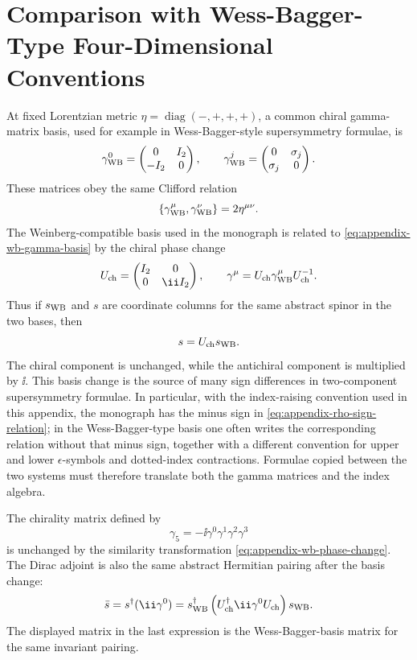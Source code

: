 \section{Comparison with Wess-Bagger-Type Four-Dimensional Conventions}

At fixed Lorentzian metric \(\eta=\operatorname{diag}(-,+,+,+)\), a common
chiral gamma-matrix basis, used for example in Wess-Bagger-style supersymmetry
formulae, is
\begin{equation}
  \gamma^0_{\rm WB}
  =
  \begin{pmatrix}
    0&I_2\\ -I_2&0
  \end{pmatrix},
  \qquad
  \gamma^j_{\rm WB}
  =
  \begin{pmatrix}
    0&\sigma_j\\ \sigma_j&0
  \end{pmatrix}.
  \label{eq:appendix-wb-gamma-basis}
\end{equation}
These matrices obey the same Clifford relation
\[
  \{\gamma^\mu_{\rm WB},\gamma^\nu_{\rm WB}\}=2\eta^{\mu\nu}.
\]
The Weinberg-compatible basis used in the monograph is related to
\eqref{eq:appendix-wb-gamma-basis} by the chiral phase change
\begin{equation}
  U_{\rm ch}
  =
  \begin{pmatrix}
    I_2&0\\0&\ii I_2
  \end{pmatrix},
  \qquad
  \gamma^\mu=U_{\rm ch}\gamma^\mu_{\rm WB}U_{\rm ch}^{-1}.
  \label{eq:appendix-wb-phase-change}
\end{equation}
Thus if \(s_{\rm WB}\) and \(s\) are coordinate columns for the same abstract
spinor in the two bases, then
\[
  s=U_{\rm ch}s_{\rm WB}.
\]
The chiral component is unchanged, while the antichiral component is
multiplied by \(\ii\).  This basis change is the source of many sign
differences in two-component supersymmetry formulae.  In particular, with the
index-raising convention used in this appendix, the monograph has the minus
sign in \eqref{eq:appendix-rho-sign-relation}; in the
Wess-Bagger-type basis one often writes the corresponding relation without
that minus sign, together with a different convention for upper and lower
\(\epsilon\)-symbols and dotted-index contractions.  Formulae copied between
the two systems must therefore translate both the gamma matrices and the
index algebra.

The chirality matrix defined by
\[
  \gamma_5=-\ii\gamma^0\gamma^1\gamma^2\gamma^3
\]
is unchanged by the similarity transformation
\eqref{eq:appendix-wb-phase-change}.  The Dirac adjoint is also the same
abstract Hermitian pairing after the basis change:
\[
  \bar s=s^\dagger(\ii\gamma^0)
  =
  s_{\rm WB}^\dagger
  \left(U_{\rm ch}^\dagger \ii\gamma^0 U_{\rm ch}\right)
  s_{\rm WB}.
\]
The displayed matrix in the last expression is the Wess-Bagger-basis matrix
for the same invariant pairing.

